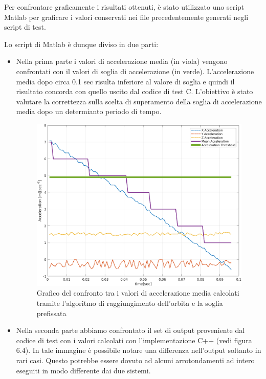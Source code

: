 \documentclass[LaM,binding=0.6cm,oneside]{../sapthesis}
\begin{document}
Per confrontare graficamente i risultati ottenuti, è stato utilizzato uno script Matlab per graficare i valori conservati nei file precedentemente generati negli script di test.

Lo script di Matlab è dunque diviso in due parti:
\begin{itemize} 
\item Nella prima parte i valori di accelerazione media (in viola) vengono confrontati con il valori di soglia di accelerazione (in verde). L'accelerazione media dopo circa 0.1 sec risulta inferiore al valore di soglia e quindi il risultato concorda con quello uscito dal codice di test C. L'obiettivo è stato valutare la correttezza sulla scelta di superamento della soglia di accelerazione media dopo un determianto periodo di tempo.
    
    \begin{figure}[htbp]
    \centerline{\includegraphics[scale=0.6]{examples/MeanAcceleration.png}}
    \caption{Grafico del confronto tra i valori di accelerazione media calcolati tramite l'algoritmo di raggiungimento dell'orbita e la soglia prefissata}
    \label{fig}
    \end{figure}
\newpage
    \item Nella seconda parte abbiamo confrontato il set di output proveniente dal codice di test con i valori calcolati con l'implementazione C++ (vedi figura 6.4). In tale immagine è possibile notare una differenza nell'output soltanto in rari casi. Questo potrebbe essere dovuto ad alcuni arrotondamenti ad intero eseguiti in modo differente dai due sistemi.


\end{itemize}
\end{document}
